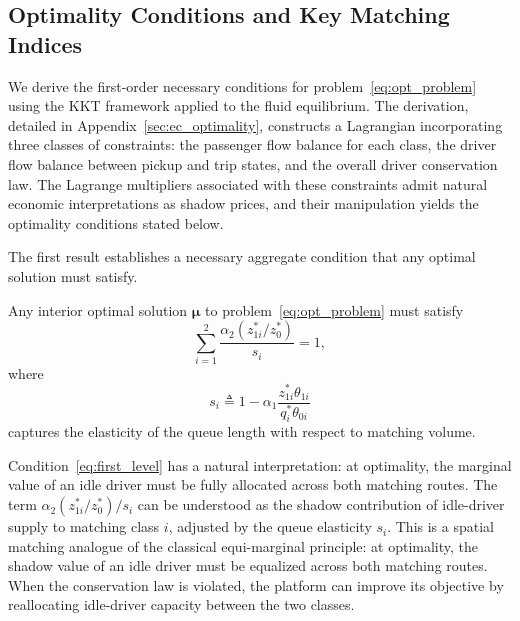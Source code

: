\subsection{Optimality Conditions and Key Matching Indices}
\label{subsec:optimality_conditions}

We derive the first-order necessary conditions for problem~\eqref{eq:opt_problem} using the KKT framework applied to the fluid equilibrium.
The derivation, detailed in Appendix~\ref{sec:ec_optimality}, constructs a Lagrangian incorporating three classes of constraints: the passenger flow balance for each class, the driver flow balance between pickup and trip states, and the overall driver conservation law.
The Lagrange multipliers associated with these constraints admit natural economic interpretations as shadow prices, and their manipulation yields the optimality conditions stated below.

The first result establishes a necessary aggregate condition that any optimal solution must satisfy.

\begin{proposition}
\label{prop:first_level}
Any interior optimal solution $\boldsymbol{\mu}$ to problem~\eqref{eq:opt_problem} must satisfy
\begin{equation}
\sum_{i=1}^2 
\frac{\alpha_2 (z_{1i}^*/z_0^*)}{s_i} = 1,
\label{eq:first_level}
\end{equation}
where 
\begin{equation*}
  s_i
  \triangleq
  1 -
  \alpha_1 \frac{z_{1i}^* \theta_{1i}}{q_i^* \theta_{0i}}
\end{equation*}
captures the elasticity of the queue length with respect to matching volume.
\end{proposition}

Condition~\eqref{eq:first_level} has a natural interpretation: at optimality, the marginal value of an idle driver must be fully allocated across both matching routes.
The term $\alpha_2 (z_{1i}^*/z_0^*)/s_i$ can be understood as the shadow contribution of idle-driver supply to matching class $i$, adjusted by the queue elasticity $s_i$.
This is a spatial matching analogue of the classical equi-marginal principle: at optimality, the shadow value of an idle driver must be equalized across both matching routes.
When the conservation law is violated, the platform can improve its objective by reallocating idle-driver capacity between the two classes.

